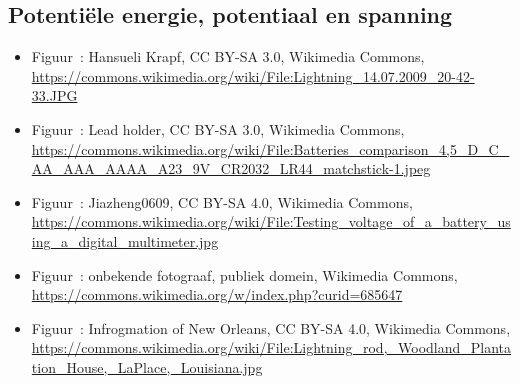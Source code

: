 \documentclass{ximera}
\begin{document}
\subsection*{Potentiële energie, potentiaal en spanning}
\begin{itemize}
        \item Figuur~: Hansueli Krapf, CC BY-SA 3.0, Wikimedia Commons, \url{https://commons.wikimedia.org/wiki/File:Lightning_14.07.2009_20-42-33.JPG}
        \item Figuur~: Lead holder, CC BY-SA 3.0, Wikimedia Commons, \url{https://commons.wikimedia.org/wiki/File:Batteries_comparison_4,5_D_C_AA_AAA_AAAA_A23_9V_CR2032_LR44_matchstick-1.jpeg}
        \item Figuur~: Jiazheng0609, CC BY-SA 4.0, Wikimedia Commons, \url{https://commons.wikimedia.org/wiki/File:Testing_voltage_of_a_battery_using_a_digital_multimeter.jpg}
        \item Figuur~: onbekende fotograaf, publiek domein, Wikimedia Commons, \url{https://commons.wikimedia.org/w/index.php?curid=685647}
        \item Figuur~: Infrogmation of New Orleans, CC BY-SA 4.0, Wikimedia Commons, \url{https://commons.wikimedia.org/wiki/File:Lightning_rod,_Woodland_Plantation_House,_LaPlace,_Louisiana.jpg}
\end{itemize}
\end{document}
